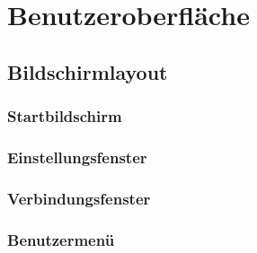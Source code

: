 \chapter{Benutzeroberfläche}
\section{Bildschirmlayout}
\subsection{Startbildschirm}
\subsection{Einstellungsfenster}
\subsection{Verbindungsfenster}
\subsection{Benutzermenü}
